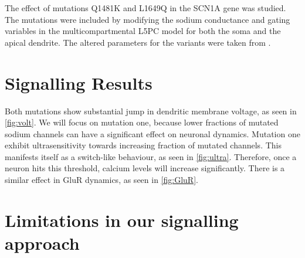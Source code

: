 The effect of mutations Q1481K and L1649Q in the SCN1A gene was studied. The mutations were
included by modifying the sodium conductance and gating variables in the multicompartmental L5PC
model for both the soma and the apical dendrite. The altered parameters for the variants were taken
from \cite{maki2016functional}.

\section{Signalling Results}
Both mutations show substantial jump in dendritic membrane voltage, as seen in \cref{fig:volt}. We
will focus on mutation one, because lower fractions of mutated sodium channels can have a
significant effect on neuronal dynamics. Mutation one exhibit ultrasensitivity towards increasing
fraction of mutated channels. This manifests itself as a switch-like behaviour, as seen in
\cref{fig:ultra}. Therefore, once a neuron hits this threshold, calcium levels will increase
significantly. There is a similar effect in GluR dynamics, as seen in \cref{fig:GluR}.



\section{Limitations in our signalling approach}

